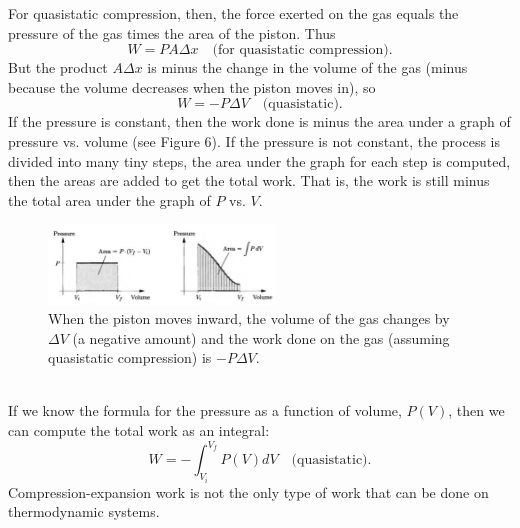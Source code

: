 \documentclass[11pt]{exam}
\begin{document}
\hspace*{10mm}For quasistatic compression, then, the force exerted on the gas equals the pressure of the gas times the area of the piston. Thus 
\begin{equation}\tag{1.27}
W=PA\Delta x \quad \text{(for quasistatic compression).}    
\end{equation}
But the product $A\Delta x$ is minus the change in the volume of the gas (minus because the volume decreases when the piston moves in), so 
\begin{equation}\tag{1.28}
W=-P\Delta V \quad\text{(quasistatic).}    
\end{equation}
\newpage
\hspace*{10mm}If the pressure is constant, then the work done is minus the area under a graph of pressure vs. volume (see Figure 6). If the pressure is not constant, the process is divided into many tiny steps, the area under the graph for each step is computed, then the areas are added to get the total work. That is, the work is still minus the total area under the graph of $P$ vs. $V$.
\begin{figure}[htp]
    \centering
    \includegraphics[width=6cm]{figure6.png}
    \caption{When the piston moves inward, the volume of the gas changes by $\Delta V$ (a negative amount) and the work done on the gas (assuming quasistatic compression) is $-P\Delta V$.}
\label{fig:quasistatic_integral}
\end{figure}\\
\hspace*{10mm}If we know the formula for the pressure as a function of volume, $P(V)$, then we can compute the total work as an integral:
\begin{equation}\tag{1.29}
W=-\int_{V_i}^{V_f} P(V)dV\quad\text{(quasistatic).}  
\end{equation}
\hspace*{10mm}Compression-expansion work is not the only type of work that can be done on thermodynamic systems. 
\newpage
\end{document}
